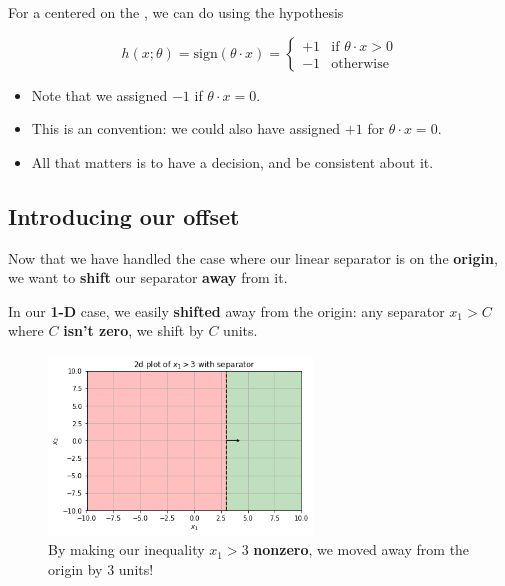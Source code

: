         \begin{kequation}
            For a  centered on the , we can do  using the hypothesis
            
            \begin{equation*}
                h(x; \theta) = \text{sign}(\theta \cdot x )= 
                \begin{cases}
                    +1 & \text{if $\theta \cdot x > 0$} \\
                    -1 & \text{otherwise}
                \end{cases}
            \end{equation*}

            \subsecdiv

            \begin{itemize}
                \item Note that we assigned $-1$ if $\theta \cdot x=0$.
                \item This is an  convention: we could also have assigned $+1$ for $\theta \cdot x=0$.
                \item All that matters is to have a decision, and be consistent about it.
            \end{itemize}
        \end{kequation}
        
    \subsection{Introducing our offset}
        
        Now that we have handled the case where our linear separator is on the \textbf{origin}, we want to \textbf{shift} our separator \textbf{away} from it.
        
        In our \textbf{1-D} case, we easily \textbf{shifted} away from the origin: any separator $x_1>C$ where $C$ \textbf{isn't zero}, we shift by $C$ units.
        
        \begin{figure}[H]
            \centering
                \includegraphics[width=70mm,scale=0.5]{images/classification_images/x1_2d_plot_separator.png}
                \caption*{By making our inequality $x_1>3$ \textbf{nonzero}, we moved away from the origin by 3 units!}
        \end{figure}
        
